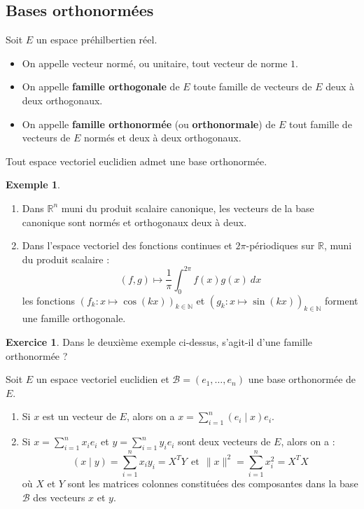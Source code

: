 \documentclass[french]{article}
\newcommand{\N}{\mathbb{N}}
\newcommand{\R}{\mathbb{R}}
\theoremstyle{plain}
\theoremstyle{definition}
\newtheorem*{ex}{Exemple}
\newtheorem{exo}{Exercice}
\theoremstyle{remark}
\begin{document}
\subsection{Bases orthonormées}
Soit $E$ un espace préhilbertien réel.

\begin{dfn}
	\begin{itemize}
		\item On appelle vecteur normé, ou unitaire, tout vecteur de norme $1$.
		\item On appelle \textbf{famille orthogonale} de $E$ toute famille de vecteurs de $E$ deux à deux orthogonaux.
		\item On appelle \textbf{famille orthonormée} (ou \textbf{orthonormale}) de $E$ tout famille de vecteurs de $E$ normés et deux à deux orthogonaux.
	\end{itemize}
\end{dfn}

\begin{thm}{}
	Tout espace vectoriel euclidien admet une base orthonormée.
\end{thm}

\begin{ex}
	\begin{enumerate}
		\item Dans $\R^n$ muni du produit scalaire canonique, les vecteurs de la base canonique sont normés et orthogonaux deux à deux.
		\item Dans l'espace vectoriel des fonctions continues et $2\pi$-périodiques sur $\R$, muni du produit scalaire : $$(f,g)\mapsto\frac{1}{\pi}\int_{0}^{2\pi}f(x)g(x)\ dx$$ les fonctions $(f_k:x\mapsto\cos(kx))_{k\in\N}$ et $(g_k:x\mapsto\sin(kx))_{k\in\N}$ forment une famille orthogonale.
	\end{enumerate}
\end{ex}

\begin{exo}
	Dans le deuxième exemple ci-dessus, s'agit-il d'une famille orthonormée ?
\end{exo}

\begin{thm}{}
	Soit $E$ un espace vectoriel euclidien et $\mathcal{B}=(e_1,\ldots,e_n)$ une base orthonormée de $E$.
	\begin{enumerate}
		\item Si $x$ est un vecteur de $E$, alors on a $x=\displaystyle\sum_{i=1}^{n}(e_i\mid x)e_i$.
		\item Si $x=\displaystyle\sum_{i=1}^{n}x_ie_i$ et $y=\displaystyle\sum_{i=1}^{n}y_ie_i$ sont deux vecteurs de $E$, alors on a : $$(x\mid y)=\sum_{i=1}^{n}x_iy_i=X^TY\ \ \text{et}\ \ \lVert x\rVert^2=\sum_{i=1}^{n}x_i^2=X^TX$$ où $X$ et $Y$ sont les matrices colonnes constituées des composantes dans la base $\mathcal{B}$ des vecteurs $x$ et $y$.
	\end{enumerate}
\end{thm}
\end{document}
